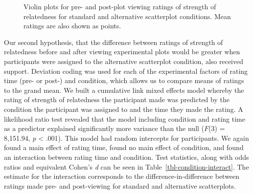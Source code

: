 \documentclass[manuscript,screen,review,anonymous]{acmart}
\begin{document}
\begin{figure}


\caption{\label{fig-descriptives}Violin plots for pre- and post-plot
viewing ratings of strength of relatedness for standard and alternative
scatterplot conditions. Mean ratings are also shown as points.}

\end{figure}%

Our second hypothesis, that the difference between ratings of strength
of relatedness before and after viewing experimental plots would be
greater when participants were assigned to the alternative scatterplot
condition, also received support. Deviation coding was used for each of
the experimental factors of rating time (pre- or post-) and condition,
which allows us to compare means of ratings to the grand mean. We built
a cumulative link mixed effects model whereby the rating of strength of
relatedness the participant made was predicted by the condition the
participant was assigned to and the time they made the rating. A
likelihood ratio test revealed that the model including condition and
rating time as a predictor explained significantly more variance than
the null (\(F\)(3) = 8,151.94, \emph{p} \textless{} .001). This model
had random intercepts for participants. We again found a main effect of
rating time, found no main effect of condition, and found an interaction
between rating time and condition. Test statistics, along with odds
ratios and equivalent Cohen's \emph{d} can be seen in
Table~\ref{tbl-condition-interact}. The estimate for the interaction
corresponds to the difference-in-difference between ratings made pre-
and post-viewing for standard and alternative scatterplots.
\end{document}
